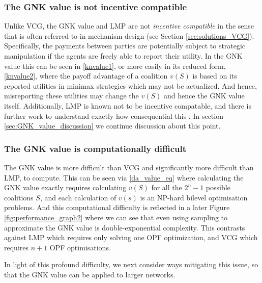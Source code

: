 \subsubsection*{The GNK value is not incentive compatible}
Unlike VCG, the GNK value and LMP are not \emph{incentive compatible} in the sense that is often referred-to in mechanism design (see Section \ref{sec:solutions_VCG}).
Specifically, the payments between parties are potentially subject to strategic manipulation if the agents are freely able to report their utility.
In the GNK value this can be seen in \eqref{knvalue1}, or more easily in its reduced form, \eqref{knvalue2}, where the payoff advantage of a coalition $v(S)$ is based on its reported utilities in minimax strategies which may not be actualized.
And hence, misreporting these utilities may change the $v(S)$ and hence the GNK value itself.
Additionally, LMP is known not to be incentive compatable, and there is further work to understand exactly how consequential this \cite{8054716}.
In section \ref{sec:GNK_value_discussion} we continue discussion about this point.

\subsubsection*{The GNK value is computationally difficult}
The GNK value is more difficult than VCG and significantly more difficult than LMP, to compute.
This can be seen via \eqref{da_value_eq} where calculating the GNK value exactly requires calculating $v(S)$ for all the $2^n-1$ possible coalitions $S$, and each calculation of $v(s)$ is an NP-hard bilevel optimisation problems.
And this computational difficulty is reflected in a later Figure \ref{fig:performance_graph2} where we can see that even using sampling to approximate the GNK value is double-exponential complexity. 
This contrasts against LMP which requires only solving one OPF optimization, and VCG which requires $n+1$ OPF optimisations.

In light of this profound difficulty, we next consider ways mitigating this issue, so that the GNK value can be applied to larger networks.


